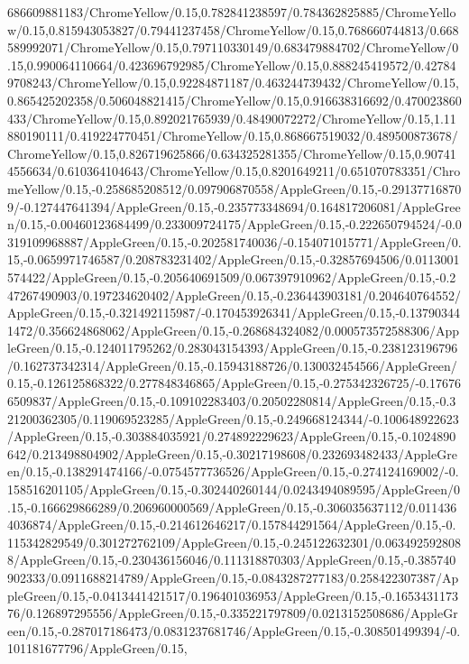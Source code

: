 {\begin{tikzternal}
{686609881183/ChromeYellow/0.15,0.782841238597/0.784362825885/ChromeYellow/0.15,0.815943053827/0.79441237458/ChromeYellow/0.15,0.768660744813/0.668589992071/ChromeYellow/0.15,0.797110330149/0.683479884702/ChromeYellow/0.15,0.990064110664/0.423696792985/ChromeYellow/0.15,0.888245419572/0.427849708243/ChromeYellow/0.15,0.92284871187/0.463244739432/ChromeYellow/0.15,0.865425202358/0.506048821415/ChromeYellow/0.15,0.916638316692/0.470023860433/ChromeYellow/0.15,0.892021765939/0.48490072272/ChromeYellow/0.15,1.11880190111/0.419224770451/ChromeYellow/0.15,0.868667519032/0.489500873678/ChromeYellow/0.15,0.826719625866/0.634325281355/ChromeYellow/0.15,0.907414556634/0.610364104643/ChromeYellow/0.15,0.8201649211/0.651070783351/ChromeYellow/0.15,-0.258685208512/0.097906870558/AppleGreen/0.15,-0.291377168709/-0.127447641394/AppleGreen/0.15,-0.235773348694/0.164817206081/AppleGreen/0.15,-0.00460123684499/0.233009724175/AppleGreen/0.15,-0.222650794524/-0.0319109968887/AppleGreen/0.15,-0.202581740036/-0.154071015771/AppleGreen/0.15,-0.0659971746587/0.208783231402/AppleGreen/0.15,-0.32857694506/0.0113001574422/AppleGreen/0.15,-0.205640691509/0.067397910962/AppleGreen/0.15,-0.247267490903/0.197234620402/AppleGreen/0.15,-0.236443903181/0.204640764552/AppleGreen/0.15,-0.321492115987/-0.170453926341/AppleGreen/0.15,-0.137903441472/0.356624868062/AppleGreen/0.15,-0.268684324082/0.000573572588306/AppleGreen/0.15,-0.124011795262/0.283043154393/AppleGreen/0.15,-0.238123196796/0.162737342314/AppleGreen/0.15,-0.15943188726/0.130032454566/AppleGreen/0.15,-0.126125868322/0.277848346865/AppleGreen/0.15,-0.275342326725/-0.176766509837/AppleGreen/0.15,-0.109102283403/0.20502280814/AppleGreen/0.15,-0.321200362305/0.119069523285/AppleGreen/0.15,-0.249668124344/-0.100648922623/AppleGreen/0.15,-0.303884035921/0.274892229623/AppleGreen/0.15,-0.1024890642/0.213498804902/AppleGreen/0.15,-0.30217198608/0.232693482433/AppleGreen/0.15,-0.138291474166/-0.0754577736526/AppleGreen/0.15,-0.274124169002/-0.158516201105/AppleGreen/0.15,-0.302440260144/0.0243494089595/AppleGreen/0.15,-0.166629866289/0.206960000569/AppleGreen/0.15,-0.306035637112/0.0114364036874/AppleGreen/0.15,-0.214612646217/0.157844291564/AppleGreen/0.15,-0.115342829549/0.301272762109/AppleGreen/0.15,-0.245122632301/0.0634925928088/AppleGreen/0.15,-0.230436156046/0.111318870303/AppleGreen/0.15,-0.385740902333/0.0911688214789/AppleGreen/0.15,-0.0843287277183/0.258422307387/AppleGreen/0.15,-0.0413441421517/0.196401036953/AppleGreen/0.15,-0.165343117376/0.126897295556/AppleGreen/0.15,-0.335221797809/0.0213152508686/AppleGreen/0.15,-0.287017186473/0.0831237681746/AppleGreen/0.15,-0.308501499394/-0.101181677796/AppleGreen/0.15,
}
\end{tikzternal}}
